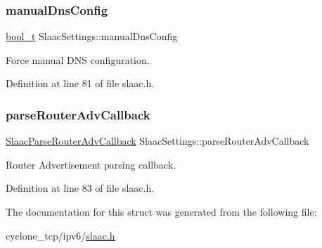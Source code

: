 \subsubsection{\texorpdfstring{manual\+Dns\+Config}{manualDnsConfig}}
{\footnotesize\ttfamily \hyperlink{compiler__port_8h_a812d16e5494522586b3784e55d479912}{bool\+\_\+t} Slaac\+Settings\+::manual\+Dns\+Config}



Force manual D\+NS configuration. 



Definition at line 81 of file slaac.\+h.

\mbox{\label{structSlaacSettings_ad2dd037086f07cb77cd6ec8cc57a4414}} 
\subsubsection{\texorpdfstring{parse\+Router\+Adv\+Callback}{parseRouterAdvCallback}}
{\footnotesize\ttfamily \hyperlink{slaac_8h_a66c0e8308667df584798793bb1755415}{Slaac\+Parse\+Router\+Adv\+Callback} Slaac\+Settings\+::parse\+Router\+Adv\+Callback}



Router Advertisement parsing callback. 



Definition at line 83 of file slaac.\+h.



The documentation for this struct was generated from the following file\+:\begin{DoxyCompactItemize}
\item 
cyclone\+\_\+tcp/ipv6/\hyperlink{slaac_8h}{slaac.\+h}\end{DoxyCompactItemize}
